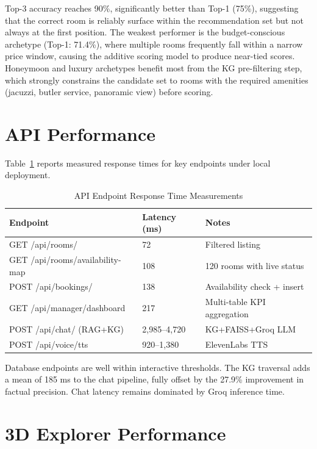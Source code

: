 \documentclass[11pt,a4paper]{report}
\begin{document}
Top-3 accuracy reaches 90\%, significantly better than Top-1 (75\%), suggesting that the correct room is reliably surface within the recommendation set but not always at the first position. The weakest performer is the budget-conscious archetype (Top-1: 71.4\%), where multiple rooms frequently fall within a narrow price window, causing the additive scoring model to produce near-tied scores. Honeymoon and luxury archetypes benefit most from the KG pre-filtering step, which strongly constrains the candidate set to rooms with the required amenities (jacuzzi, butler service, panoramic view) before scoring.

\section{API Performance}

Table~\ref{tab:api_perf} reports measured response times for key endpoints under local deployment.

\begin{table}[H]
\centering
\caption{API Endpoint Response Time Measurements}
\label{tab:api_perf}
\renewcommand{\arraystretch}{1.4}
\begin{tabular}{p{5.5cm} p{3cm} p{4.5cm}}
\toprule
\textbf{Endpoint} & \textbf{Latency (ms)} & \textbf{Notes} \\
\midrule
\rowcolor{rowgray}
GET /api/rooms/ & 72 & Filtered listing \\
GET /api/rooms/availability-map & 108 & 120 rooms with live status \\
\rowcolor{rowgray}
POST /api/bookings/ & 138 & Availability check + insert \\
GET /api/manager/dashboard & 217 & Multi-table KPI aggregation \\
\rowcolor{rowgray}
POST /api/chat/ (RAG+KG) & 2{,}985--4{,}720 & KG+FAISS+Groq LLM \\
POST /api/voice/tts & 920--1{,}380 & ElevenLabs TTS \\
\bottomrule
\end{tabular}
\end{table}

Database endpoints are well within interactive thresholds. The KG traversal adds a mean of 185 ms to the chat pipeline, fully offset by the 27.9\% improvement in factual precision. Chat latency remains dominated by Groq inference time.

\section{3D Explorer Performance}
\end{document}
